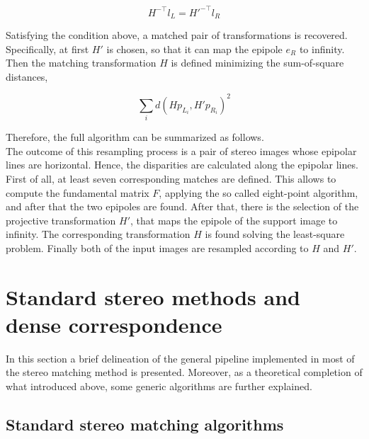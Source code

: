 \begin{equation}
	H^{-\top} l_L = H'^{-\top} l_R
\end{equation}

Satisfying the condition above, a matched pair of transformations is recovered.\\
Specifically, at first $H'$ is chosen, so that it can map the epipole $e_R$ to infinity. 
Then the matching transformation $H$ is defined minimizing the sum-of-square distances,

\begin{equation}
\label{eqn:match-transf-constr}
	\sum_i d(H p_{L_i}, H'p_{R_i})^2
\end{equation}

Therefore, the full algorithm can be summarized as follows.\\
The outcome of this resampling process is a pair of stereo images whose epipolar lines are horizontal.
Hence, the disparities are calculated along the epipolar lines. 
First of all, at least seven corresponding matches are defined.
This allows to compute the fundamental matrix $F$, applying the so called eight-point algorithm, and after that the two epipoles are found.
After that, there is the selection of the projective transformation $H'$, that maps the epipole of the support image to infinity.
The corresponding transformation $H$ is found solving the least-square problem.
Finally both of the input images are resampled according to $H$ and $H'$.

\section{Standard stereo methods and dense correspondence}
\label{section:stereo-methods}

In this section a brief delineation of the general pipeline implemented in most of the stereo matching method is presented. 
Moreover, as a theoretical completion of what introduced above, some generic algorithms are further explained.

\subsection{Standard stereo matching algorithms}
\label{subsection:standard-methods}

